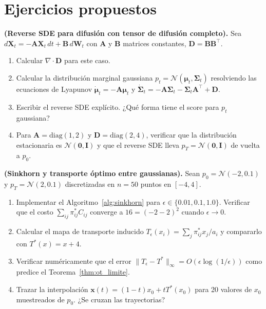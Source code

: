 \section*{Ejercicios propuestos}

\begin{ejercicio}
\textbf{(Reverse SDE para difusión con tensor de difusión completo).}
Sea $d\bm{X}_t = -\bm{A}\bm{X}_t\,dt + \bm{B}\,d\bm{W}_t$ con $\bm{A}$
y $\bm{B}$ matrices constantes, $\bm{D} = \bm{B}\bm{B}^\top$.
\begin{enumerate}[label=(\alph*)]
  \item Calcular $\nabla\cdot\bm{D}$ para este caso.
  \item Calcular la distribución marginal gaussiana $p_t =
        \mathcal{N}(\bm{\mu}_t,\bm{\Sigma}_t)$ resolviendo las ecuaciones
        de Lyapunov $\dot{\bm{\mu}}_t = -\bm{A}\bm{\mu}_t$ y
        $\dot{\bm{\Sigma}}_t = -\bm{A}\bm{\Sigma}_t - \bm{\Sigma}_t\bm{A}^\top + \bm{D}$.
  \item Escribir el reverse SDE explícito. ¿Qué forma tiene el score para
        $p_t$ gaussiana?
  \item Para $\bm{A} = \mathrm{diag}(1,2)$ y $\bm{D} = \mathrm{diag}(2,4)$,
        verificar que la distribución estacionaria es $\mathcal{N}(\bm{0},\bm{I})$
        y que el reverse SDE lleva $p_T = \mathcal{N}(\bm{0},\bm{I})$ de vuelta
        a $p_0$.
\end{enumerate}
\end{ejercicio}

\begin{ejercicio}
\textbf{(Sinkhorn y transporte óptimo entre gaussianas).}
Sean $p_0 = \mathcal{N}(-2,0.1)$ y $p_T = \mathcal{N}(2,0.1)$ discretizadas en
$n=50$ puntos en $[-4,4]$.
\begin{enumerate}[label=(\alph*)]
  \item Implementar el Algoritmo~\ref{alg:sinkhorn} para $\epsilon \in
        \{0.01, 0.1, 1.0\}$. Verificar que el costo $\sum_{ij}\pi_{ij}^*C_{ij}$
        converge a $16 = (-2-2)^2$ cuando $\epsilon\to 0$.
  \item Calcular el mapa de transporte inducido $T_\epsilon(x_i) =
        \sum_j \pi_{ij}^* x_j / a_i$ y compararlo con $T^*(x) = x+4$.
  \item Verificar numéricamente que el error $\|T_\epsilon - T^*\|_\infty =
        O(\epsilon\log(1/\epsilon))$ como predice el Teorema~\ref{thm:ot_limite}.
  \item Trazar la interpolación $\bm{x}(t) = (1-t)x_0 + tT^*(x_0)$ para 20
        valores de $x_0$ muestreados de $p_0$. ¿Se cruzan las trayectorias?
\end{enumerate}
\end{ejercicio}


